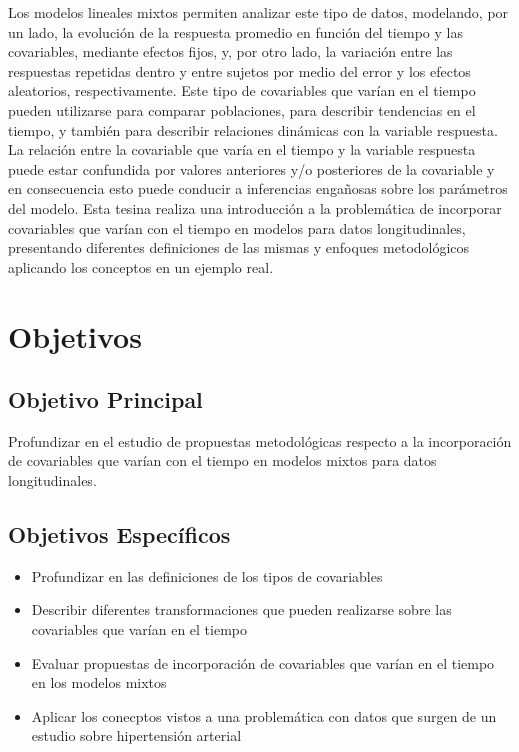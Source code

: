 \documentclass[12pt]{article}
\begin{document}
Los modelos lineales mixtos permiten
analizar este tipo de datos, modelando, por un lado, la evolución de la respuesta promedio en función del tiempo y las
covariables, mediante efectos fijos, y, por otro lado, la variación entre las respuestas repetidas dentro y entre sujetos
por medio del error y los efectos aleatorios, respectivamente. Este tipo de covariables que varían en el tiempo pueden
utilizarse para comparar poblaciones, para describir tendencias en el tiempo, y también para describir relaciones
dinámicas con la variable respuesta. La relación entre la covariable que varía en el tiempo y la variable respuesta
puede estar confundida por valores anteriores y/o posteriores de la covariable y en consecuencia esto puede conducir
a inferencias engañosas sobre los parámetros del modelo. Esta tesina realiza una introducción a la problemática de
incorporar covariables que varían con el tiempo en modelos para datos longitudinales, presentando diferentes definiciones
de las mismas y enfoques metodológicos aplicando los conceptos en un ejemplo real. 


\newpage
\section{Objetivos}

\subsection{Objetivo Principal}

Profundizar en el estudio de propuestas metodológicas respecto a la incorporación de covariables que varían con
el tiempo en modelos mixtos para datos longitudinales.

\subsection{Objetivos Específicos}

\begin{itemize}
	\item Profundizar en las definiciones de los tipos de covariables
	\item Describir diferentes transformaciones que pueden realizarse sobre las covariables que varían en el tiempo
	\item Evaluar propuestas de incorporación de covariables que varían en el tiempo en los modelos mixtos
	\item Aplicar los conecptos vistos a una problemática con datos que surgen de un estudio sobre hipertensión arterial
\end{itemize}
\end{document}
